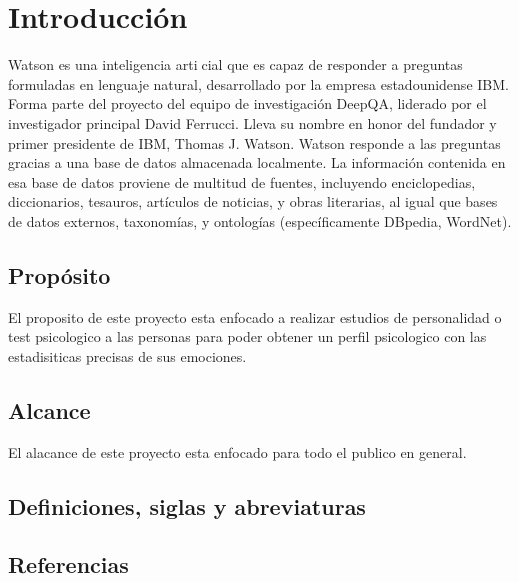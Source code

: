 \chapter{Introducción}
Watson es una inteligencia articial que es capaz de responder a preguntas
formuladas en lenguaje natural, desarrollado por la empresa estadounidense
IBM. Forma parte del proyecto del equipo de investigación DeepQA, liderado
por el investigador principal David Ferrucci. Lleva su nombre en honor del
fundador y primer presidente de IBM, Thomas J. Watson. Watson responde
a las preguntas gracias a una base de datos almacenada localmente. La
información contenida en esa base de datos proviene de multitud de fuentes,
incluyendo enciclopedias, diccionarios, tesauros, artículos de noticias, y
obras literarias, al igual que bases de datos externos, taxonomías, y ontologías
(específicamente DBpedia, WordNet).

\section{Propósito}
El proposito de este proyecto esta enfocado a realizar estudios de personalidad o test psicologico a las personas
para poder obtener un perfil psicologico con las estadisiticas precisas de sus emociones.

\section{Alcance}
El alacance de este proyecto esta enfocado para todo el publico en general.

\section{Definiciones, siglas y abreviaturas}

\section{Referencias}